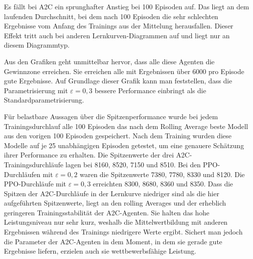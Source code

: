 Es fällt bei A2C ein sprunghafter Anstieg bei 100 Episoden auf.
Das liegt an dem laufenden Durchschnitt, bei dem nach 100 Episoden die sehr schlechten Ergebnisse vom Anfang des Trainings aus der Mittelung herausfallen.
Dieser Effekt tritt auch bei anderen Lernkurven-Diagrammen auf und liegt nur an diesem Diagrammtyp.

Aus den Grafiken geht unmittelbar hervor, dass alle diese Agenten die Gewinnzone erreichen.
Sie erreichen alle mit Ergebnissen über 6000 pro Episode gute Ergebnisse.
Auf Grundlage dieser Grafik kann man feststellen, dass die Parametrisierung mit $\varepsilon=0,3$ bessere Performance einbringt als die Standardparametrisierung.

Für belastbare Aussagen über die Spitzenperformance wurde bei jedem Trainingsdurchlauf alle 100 Episoden das nach dem Rolling Average beste Modell aus den vorigen 100 Episoden gespeichert.
Nach dem Training wurden diese Modelle auf je 25 unabhängigen Episoden getestet, um eine genauere Schätzung ihrer Performance zu erhalten.
Die Spitzenwerte der drei A2C-Trainingsdurchläufe lagen bei 8160, 8520, 7150 und 8510.
Bei den PPO-Durchläufen mit $\varepsilon=0,2$ waren die Spitzenwerte 7380, 7780, 8330 und 8120.
Die PPO-Durchläufe mit $\varepsilon=0,3$ erreichten 8300, 8680, 8360 und 8350.
Dass die Spitzen der A2C-Durchläufe in der Lernkurve niedriger sind als die hier aufgeführten Spitzenwerte, liegt an den rolling Averages und der erheblich geringeren Trainingsstabilität der A2C-Agenten.
Sie halten das hohe Leistungsniveau nur sehr kurz, weshalb die Mittelwertbildung mit anderen Ergebnissen während des Trainings niedrigere Werte ergibt.
Sichert man jedoch die Parameter der A2C-Agenten in dem Moment, in dem sie gerade gute Ergebnisse liefern, erzielen auch sie wettbewerbsfähige Leistung.

